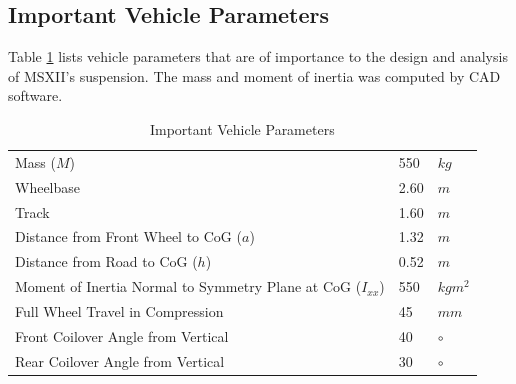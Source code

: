 \documentclass[12pt]{article}
\begin{document}
\subsection{Important Vehicle Parameters}
Table \ref{tab:params} lists vehicle parameters that are of importance to the design and analysis of MSXII's suspension. The mass and moment of inertia was computed by CAD software. 
\begin{table}[htbp]
	\centering
	\caption{Important Vehicle Parameters}
	\label{tab:params}
	\begin{tabular}{lll}
	Mass ($M$)                            	& 550  & $kg$       \\
	Wheelbase                       	 	& 2.60  & $m$  		\\
	Track                       	 		& 1.60  & $m$  		\\
	Distance from Front Wheel to CoG ($a$)	& 1.32 & $m$  		\\
	Distance from Road to CoG ($h$)		& 0.52 & $m$  		\\
	Moment of Inertia Normal to Symmetry Plane at CoG ($I_{xx}$) & 550  & $kgm^2$ \\
	Full Wheel Travel in Compression 	& 45   & $mm$ 		\\
	Front Coilover Angle from Vertical	& 40   & $\circ$ 	\\
	Rear Coilover Angle from Vertical	& 30   & $\circ$
	\end{tabular}
\end{table}
\end{document}
